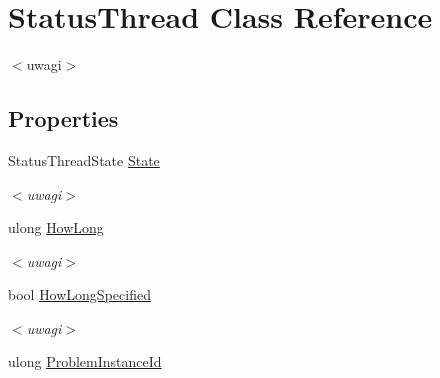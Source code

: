 \hypertarget{class_status_thread}{}\section{Status\+Thread Class Reference}
\label{class_status_thread}


$<$uwagi$>$  


\subsection*{Properties}
\begin{DoxyCompactItemize}
\item 
\hypertarget{class_status_thread_a73627d278c8db50813754da9cd22b98d}{}Status\+Thread\+State \hyperlink{class_status_thread_a73627d278c8db50813754da9cd22b98d}{State}\label{class_status_thread_a73627d278c8db50813754da9cd22b98d}

\begin{DoxyCompactList}\small\item\em $<$uwagi$>$ \end{DoxyCompactList}\item 
\hypertarget{class_status_thread_a9b8a8c6e3790c40c173e0237f258d894}{}ulong \hyperlink{class_status_thread_a9b8a8c6e3790c40c173e0237f258d894}{How\+Long}\label{class_status_thread_a9b8a8c6e3790c40c173e0237f258d894}

\begin{DoxyCompactList}\small\item\em $<$uwagi$>$ \end{DoxyCompactList}\item 
\hypertarget{class_status_thread_a97ddab85d3c9bb59febbfb60a70a6ecb}{}bool \hyperlink{class_status_thread_a97ddab85d3c9bb59febbfb60a70a6ecb}{How\+Long\+Specified}\label{class_status_thread_a97ddab85d3c9bb59febbfb60a70a6ecb}

\begin{DoxyCompactList}\small\item\em $<$uwagi$>$ \end{DoxyCompactList}\item 
\hypertarget{class_status_thread_abc5cdca139234e3e969980d10705b537}{}ulong \hyperlink{class_status_thread_abc5cdca139234e3e969980d10705b537}{Problem\+Instance\+Id}\label{class_status_thread_abc5cdca139234e3e969980d10705b537}


\end{DoxyCompactItemize}
